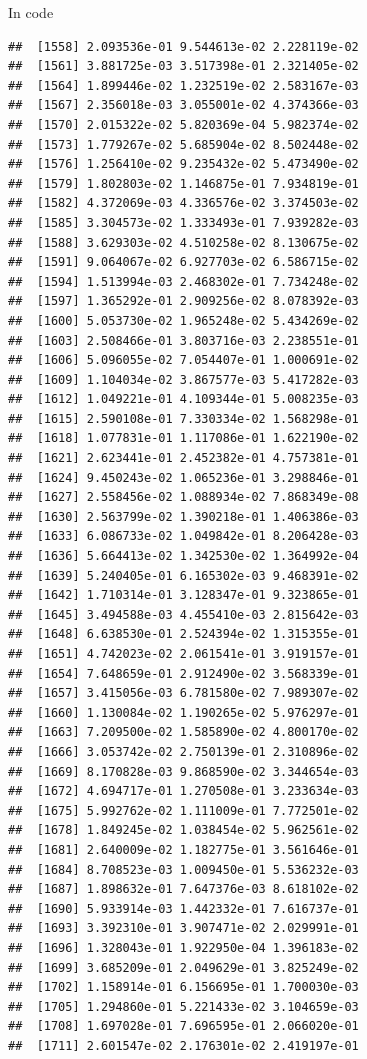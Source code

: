 \documentclass[ignorenonframetext,]{beamer}
\begin{document}
\begin{frame}[fragile]{In code}
\begin{verbatim}
##  [1558] 2.093536e-01 9.544613e-02 2.228119e-02
##  [1561] 3.881725e-03 3.517398e-01 2.321405e-02
##  [1564] 1.899446e-02 1.232519e-02 2.583167e-03
##  [1567] 2.356018e-03 3.055001e-02 4.374366e-03
##  [1570] 2.015322e-02 5.820369e-04 5.982374e-02
##  [1573] 1.779267e-02 5.685904e-02 8.502448e-02
##  [1576] 1.256410e-02 9.235432e-02 5.473490e-02
##  [1579] 1.802803e-02 1.146875e-01 7.934819e-01
##  [1582] 4.372069e-03 4.336576e-02 3.374503e-02
##  [1585] 3.304573e-02 1.333493e-01 7.939282e-03
##  [1588] 3.629303e-02 4.510258e-02 8.130675e-02
##  [1591] 9.064067e-02 6.927703e-02 6.586715e-02
##  [1594] 1.513994e-03 2.468302e-01 7.734248e-02
##  [1597] 1.365292e-01 2.909256e-02 8.078392e-03
##  [1600] 5.053730e-02 1.965248e-02 5.434269e-02
##  [1603] 2.508466e-01 3.803716e-03 2.238551e-01
##  [1606] 5.096055e-02 7.054407e-01 1.000691e-02
##  [1609] 1.104034e-02 3.867577e-03 5.417282e-03
##  [1612] 1.049221e-01 4.109344e-01 5.008235e-03
##  [1615] 2.590108e-01 7.330334e-02 1.568298e-01
##  [1618] 1.077831e-01 1.117086e-01 1.622190e-02
##  [1621] 2.623441e-01 2.452382e-01 4.757381e-01
##  [1624] 9.450243e-02 1.065236e-01 3.298846e-01
##  [1627] 2.558456e-02 1.088934e-02 7.868349e-08
##  [1630] 2.563799e-02 1.390218e-01 1.406386e-03
##  [1633] 6.086733e-02 1.049842e-01 8.206428e-03
##  [1636] 5.664413e-02 1.342530e-02 1.364992e-04
##  [1639] 5.240405e-01 6.165302e-03 9.468391e-02
##  [1642] 1.710314e-01 3.128347e-01 9.323865e-01
##  [1645] 3.494588e-03 4.455410e-03 2.815642e-03
##  [1648] 6.638530e-01 2.524394e-02 1.315355e-01
##  [1651] 4.742023e-02 2.061541e-01 3.919157e-01
##  [1654] 7.648659e-01 2.912490e-02 3.568339e-01
##  [1657] 3.415056e-03 6.781580e-02 7.989307e-02
##  [1660] 1.130084e-02 1.190265e-02 5.976297e-01
##  [1663] 7.209500e-02 1.585890e-02 4.800170e-02
##  [1666] 3.053742e-02 2.750139e-01 2.310896e-02
##  [1669] 8.170828e-03 9.868590e-02 3.344654e-03
##  [1672] 4.694717e-01 1.270508e-01 3.233634e-03
##  [1675] 5.992762e-02 1.111009e-01 7.772501e-02
##  [1678] 1.849245e-02 1.038454e-02 5.962561e-02
##  [1681] 2.640009e-02 1.182775e-01 3.561646e-01
##  [1684] 8.708523e-03 1.009450e-01 5.536232e-03
##  [1687] 1.898632e-01 7.647376e-03 8.618102e-02
##  [1690] 5.933914e-03 1.442332e-01 7.616737e-01
##  [1693] 3.392310e-01 3.907471e-02 2.029991e-01
##  [1696] 1.328043e-01 1.922950e-04 1.396183e-02
##  [1699] 3.685209e-01 2.049629e-01 3.825249e-02
##  [1702] 1.158914e-01 6.156695e-01 1.700030e-03
##  [1705] 1.294860e-01 5.221433e-02 3.104659e-03
##  [1708] 1.697028e-01 7.696595e-01 2.066020e-01
##  [1711] 2.601547e-02 2.176301e-02 2.419197e-01

\end{verbatim}
\end{frame}
\end{document}
